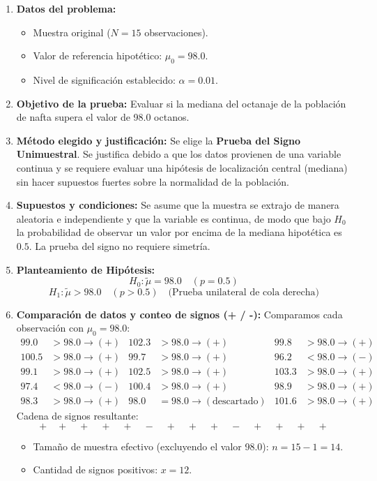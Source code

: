 \documentclass[11pt,a4paper]{article}
\begin{document}
\begin{enumerate}
    \item \textbf{Datos del problema:}
    \begin{itemize}
        \item Muestra original ($N = 15$ observaciones).
        \item Valor de referencia hipotético: $\mu_0 = 98.0$.
        \item Nivel de significación establecido: $\alpha = 0.01$.
    \end{itemize}

    \item \textbf{Objetivo de la prueba:}
    Evaluar si la mediana del octanaje de la población de nafta supera el valor de 98.0 octanos.

    \item \textbf{Método elegido y justificación:}
    Se elige la \textbf{Prueba del Signo Unimuestral}. Se justifica debido a que los datos provienen de una variable continua y se requiere evaluar una hipótesis de localización central (mediana) sin hacer supuestos fuertes sobre la normalidad de la población.

    \item \textbf{Supuestos y condiciones:}
    Se asume que la muestra se extrajo de manera aleatoria e independiente y que la variable es continua, de modo que bajo $H_0$ la probabilidad de observar un valor por encima de la mediana hipotética es $0.5$. La prueba del signo no requiere simetría.

    \item \textbf{Planteamiento de Hipótesis:}
    \[ H_0: \tilde{\mu} = 98.0 \quad (p = 0.5) \]
    \[ H_1: \tilde{\mu} > 98.0 \quad (p > 0.5) \quad \text{(Prueba unilateral de cola derecha)} \]

    \item \textbf{Comparación de datos y conteo de signos (+ / -):}
    Comparamos cada observación con $\mu_0 = 98.0$:
    \begin{align*}
        99.0 &> 98.0 \rightarrow (+) & 102.3 &> 98.0 \rightarrow (+) & 99.8 &> 98.0 \rightarrow (+) \\
        100.5 &> 98.0 \rightarrow (+) & 99.7 &> 98.0 \rightarrow (+) & 96.2 &< 98.0 \rightarrow (-) \\
        99.1 &> 98.0 \rightarrow (+) & 102.5 &> 98.0 \rightarrow (+) & 103.3 &> 98.0 \rightarrow (+) \\
        97.4 &< 98.0 \rightarrow (-) & 100.4 &> 98.0 \rightarrow (+) & 98.9 &> 98.0 \rightarrow (+) \\
        98.3 &> 98.0 \rightarrow (+) & 98.0 &= 98.0 \rightarrow (\text{descartado}) & 101.6 &> 98.0 \rightarrow (+)
    \end{align*}
    Cadena de signos resultante:
    \[ + \quad + \quad + \quad + \quad + \quad - \quad + \quad + \quad + \quad - \quad + \quad + \quad + \quad + \]
    \begin{itemize}
        \item Tamaño de muestra efectivo (excluyendo el valor 98.0): $n = 15 - 1 = 14$.
        \item Cantidad de signos positivos: $x = 12$.
    \end{itemize}


\end{enumerate}
\end{document}
